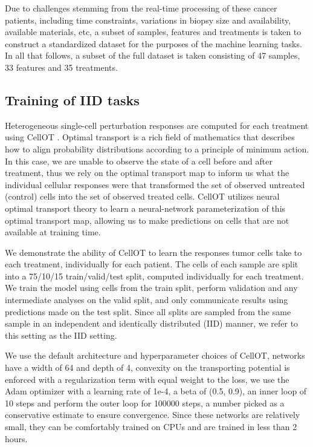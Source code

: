 Due to challenges stemming from the real-time processing of these cancer patients, including time constraints, variations in biopsy size and availability, available materials, etc, a subset of samples, features and treatments is taken to construct a standardized dataset for the purposes of the machine learning tasks.
In all that follows, a subset of the full dataset is taken consisting of 47 samples, 33 features and 35 treatments.



\subsection{Training of IID tasks}
Heterogeneous single-cell perturbation responses are computed for each treatment using CellOT \cite{bunne2023}. Optimal transport is a rich field of mathematics that describes how to align probability distributions according to a principle of minimum action. In this case, we are unable to observe the state of a cell before and after treatment, thus we rely on the optimal transport map to inform us what the individual cellular responses were that transformed the set of observed untreated (control) cells into the set of observed treated cells. CellOT utilizes neural optimal transport theory to learn a neural-network parameterization of this optimal transport map, allowing us to make predictions on cells that are not available at training time.

We demonstrate the ability of CellOT to learn the responses tumor cells take to each treatment, individually for each patient. The cells of each sample are split into a 75/10/15 train/valid/test split, computed individually for each treatment. We train the model using cells from the train split, perform validation and any intermediate analyses on the valid split, and only communicate results using predictions made on the test split. Since all splits are sampled from the same sample in an independent and identically distributed (IID) manner, we refer to this setting as the IID setting.

We use the default architecture and hyperparameter choices of CellOT, networks have a width of 64 and depth of 4, convexity on the transporting potential is enforced with a regularization term with equal weight to the loss, we use the Adam optimizer \cite{kingma2014} with a learning rate of 1e-4, a beta of (0.5, 0.9), an inner loop of 10 steps and perform the outer loop for 100000 steps, a number picked as a conservative estimate to ensure convergence. Since these networks are relatively small, they can be comfortably trained on CPUs and are trained in less than 2 hours. 

